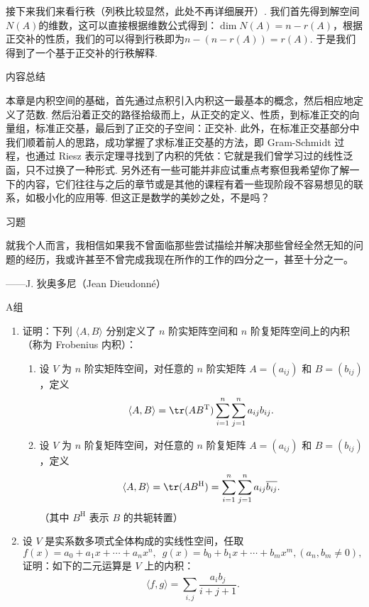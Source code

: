 接下来我们来看行秩（列秩比较显然，此处不再详细展开）. 我们首先得到解空间$N(A)$的维数，这可以直接根据维数公式得到：$\dim N(A) = n-r(A)$，根据正交补的性质，我们的可以得到行秩即为$n-(n-r(A))=r(A)$. 于是我们得到了一个基于正交补的行秩解释.

\vspace{2ex}
\centerline{\heiti \Large 内容总结}

本章是内积空间的基础，首先通过点积引入内积这一最基本的概念，然后相应地定义了范数. 然后沿着正交的路径拾级而上，从正交的定义、性质，到标准正交的向量组，标准正交基，最后到了正交的子空间：正交补. 此外，在标准正交基部分中我们顺着前人的思路，成功掌握了求标准正交基的方法，即 Gram-Schmidt 过程，也通过 Riesz 表示定理寻找到了内积的凭依：它就是我们曾学习过的线性泛函，只不过换了一种形式. 另外还有一些可能并非应试重点考察但我希望你了解一下的内容，它们往往与之后的章节或是其他的课程有着一些现阶段不容易想见的联系，如极小化的应用等. 但这正是数学的美妙之处，不是吗？

\vspace{2ex}
\centerline{\heiti \Large 习题}

\vspace{2ex}
{\kaishu 就我个人而言，我相信如果我不曾面临那些尝试描绘并解决那些曾经全然无知的问题的经历，我或许甚至不曾完成我现在所作的工作的四分之一，甚至十分之一。}
\begin{flushright}
    \kaishu
    ——J. 狄奥多尼（Jean Dieudonné）
\end{flushright}

\centerline{\heiti A组}
\begin{enumerate}
    \item 证明：下列 $\langle A, B \rangle$ 分别定义了 $n$ 阶实矩阵空间和 $n$ 阶复矩阵空间上的内积（称为 Frobenius 内积）：
          \begin{enumerate}
              \item 设 $V$ 为 $n$ 阶实矩阵空间，对任意的 $n$ 阶实矩阵 $A = (a_{ij})$ 和 $B = (b_{ij})$，定义
                    \[
                        \langle A, B \rangle = \tr(A B^{\mathrm{T}}) \sum_{i = 1}^{n} \sum_{j = 1}^{n} a_{ij}b_{ij}.
                    \]
              \item 设 $V$ 为 $n$ 阶复矩阵空间，对任意的 $n$ 阶复矩阵 $A = (a_{ij})$ 和 $B = (b_{ij})$，定义
                    \[
                        \langle A, B \rangle = \tr(A B^{\mathrm{H}}) = \sum_{i = 1}^{n} \sum_{j = 1}^{n} a_{ij}\overline{b_{ij}}.
                    \]
                    （其中 $B^{\mathrm{H}}$ 表示 $B$ 的共轭转置）
          \end{enumerate}
    \item 设 $V$ 是实系数多项式全体构成的实线性空间，任取
          \[ f(x) = a_0 + a_1 x + \cdots + a_n x^n, \enspace g(x) = b_0 + b_1 x + \cdots + b_m x^m, (a_n, b_m \neq 0), \]
          证明：如下的二元运算是 $V$ 上的内积：
          \[ \langle f, g \rangle = \sum_{i, j} \dfrac{a_i b_j}{i + j + 1}. \]
\end{enumerate}

